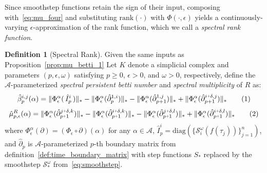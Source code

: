 \documentclass[10pt]{article}
\numberwithin{equation}{section}
\newcommand{\+}{%
	\raisebox{0.18ex}{\scaleobj{0.55}{+}}
}
\theoremstyle{definition}
\newtheorem{definition}{Definition}
\theoremstyle{definition}
\newcommand\numberthis{\addtocounter{equation}{1}\tag{\theequation}}
\begin{document}
Since smoothstep functions retain the sign of their input, composing with~\eqref{eq:mu_four} and substituting $\mathrm{rank}(\cdot)$ with $\Phi(\cdot, \epsilon)$ yields a continuously-varying $\epsilon$-approximation of the rank function, which we call a \emph{spectral rank function}. 
\begin{definition}[Spectral Rank]\label{def:smooth_mu}
Given the same inputs as Proposition~\ref{prop:mu_betti_1}
Let $K$ denote a simplicial complex and parameters $(p, \epsilon, \omega)$ satisfying $p \geq 0$, $\epsilon > 0$, and $\omega > 0$, respectively, define the $\mathcal{A}$-parameterized \emph{spectral persistent betti number} and \emph{spectral multiplicity} of $R$ as:
	\begin{equation}\label{eq:bett_cont}
\hat{\beta}_p^{i,j}(\alpha) = 
\lVert \Phi_\epsilon^\alpha(\,\hat{I}_{p}^i\,)\rVert_\ast -
\lVert \Phi_\epsilon^\alpha(\hat{\partial}_{p}^{1, i}) \rVert_\ast - 
\lVert \Phi_\epsilon^\alpha(\hat{\partial}_{p+1}^{1, j}) \rVert_\ast + 
\lVert \Phi_\epsilon^\alpha(\hat{\partial}_{p+1}^{i\+\delta, j}) \rVert_\ast \numberthis
	\end{equation}
	\begin{equation}\label{eq:mu_cont}
	\hat{\mu}_{p,\epsilon}^R(\alpha) = 
		 \lVert \Phi_\epsilon^\alpha(\hat{\partial}_{p\+1}^{j \+ \delta, k}) \rVert_\ast - 
		 \lVert \Phi_\epsilon^\alpha(\hat{\partial}_{p\+1}^{i \+ \delta, k}) \rVert_\ast -  
		 \lVert \Phi_\epsilon^\alpha(\hat{\partial}_{p\+1}^{j \+ \delta, l}) \rVert_\ast + 
		 \lVert \Phi_\epsilon^\alpha(\hat{\partial}_{p\+1}^{i \+ \delta, l}) \rVert_\ast \numberthis
\end{equation}
where $\Phi_\epsilon^\alpha(\partial) = (\Phi_\epsilon \circ \partial)(\alpha)$ for any $\alpha \in \mathcal{A}$, $\hat{I}_{p}^i = \mathrm{diag}(\{ \mathcal{S}_i^\omega(f(\tau_j)) \}_{j=1}^{n} )$, and $\hat{\partial}_p$ is $\mathcal{A}$-parameterized $p$-th boundary matrix from definition~\ref{def:time_boundary_matrix} with step functions $S_\ast$ replaced by the smoothstep $\mathcal{S}_\ast^\omega$ from~\eqref{eq:smoothstep}.
\end{definition}
\end{document}

